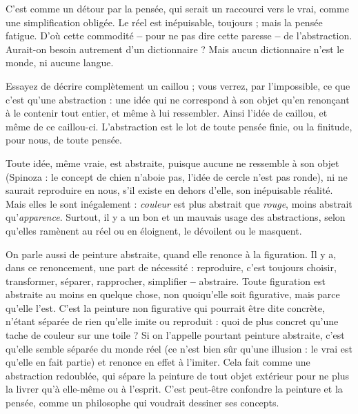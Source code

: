 C’est comme un détour par la pensée, qui serait un raccourci vers le vrai,
comme une simplification obligée. Le réel est inépuisable, toujours ; mais la
pensée fatigue. D’où cette commodité {\bf --} pour ne pas dire cette paresse {\bf --} de
l’abstraction. Aurait-on besoin autrement d’un dictionnaire ? Mais aucun dictionnaire
n’est le monde, ni aucune langue.

Essayez de décrire complètement un caillou ; vous verrez, par l'impossible,
ce que c’est qu’une abstraction : une idée qui ne correspond à son objet qu’en
renonçant à le contenir tout entier, et même à lui ressembler. Ainsi l’idée de
caillou, et même de ce caillou-ci. L’abstraction est le lot de toute pensée finie,
ou la finitude, pour nous, de toute pensée.

Toute idée, même vraie, est abstraite, puisque aucune ne ressemble à son
objet (Spinoza : le concept de chien n’aboie pas, l’idée de cercle n'est pas
ronde), ni ne saurait reproduire en nous, s’il existe en dehors d’elle, son inépuisable 
réalité. Mais elles le sont inégalement : {\it couleur} est plus abstrait que {\it rouge},
moins abstrait qu’{\it apparence}. Surtout, il y a un bon et un mauvais usage des abstractions,
selon qu’elles ramènent au réel ou en éloignent, le dévoilent ou le
masquent.

On parle aussi de peinture abstraite, quand elle renonce à la figuration. Il y
a, dans ce renoncement, une part de nécessité : reproduire, c’est toujours
choisir, transformer, séparer, rapprocher, simplifier {\bf --} abstraire. Toute figuration
est abstraite au moins en quelque chose, non quoiqu’elle soit figurative,
mais parce qu’elle l'est. C’est la peinture non figurative qui pourrait être dite
concrète, n'étant séparée de rien qu’elle imite ou reproduit : quoi de plus
concret qu'une tache de couleur sur une toile ? Si on l'appelle pourtant peinture
abstraite, c’est qu’elle semble séparée du monde réel (ce n’est bien sûr
qu'une illusion : le vrai est qu’elle en fait partie) et renonce en effet à l’imiter.
Cela fait comme une abstraction redoublée, qui sépare la peinture de tout objet
extérieur pour ne plus la livrer qu’à elle-même ou à l'esprit. C’est peut-être
confondre la peinture et la pensée, comme un philosophe qui voudrait dessiner
ses concepts.


